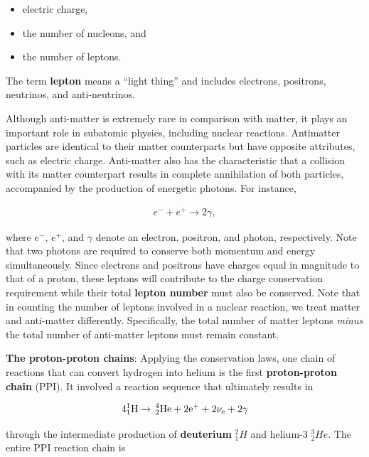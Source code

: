 \documentclass[a4paper,10pt]{article}
\begin{document}
\begin{itemize}
    \item electric charge,
    \item the number of nucleons, and
    \item the number of leptons.
\end{itemize}

{\noindent}The term \textbf{lepton} means a ``light thing'' and includes electrons, positrons, neutrinos, and anti-neutrinos.

{\noindent}Although anti-matter is extremely rare in comparison with matter, it plays an important role in subatomic physics, including nuclear reactions. Antimatter particles are identical to their matter counterparts but have opposite attributes, such as electric charge. Anti-matter also has the characteristic that a collision with its matter counterpart results in complete annihilation of both particles, accompanied by the production of energetic photons. For instance,

\begin{align*}
    e^- + e^+ \rightarrow 2\gamma,
\end{align*}

{\noindent}where $e^-$, $e^+$, and $\gamma$ denote an electron, positron, and photon, respectively. Note that two photons are required to conserve both momentum and energy simultaneously. Since electrons and positrons have charges equal in magnitude to that of a proton, these leptons will contribute to the charge conservation requirement while their total \textbf{lepton number} must also be conserved. Note that in counting the number of leptons involved in a nuclear reaction, we treat matter and anti-matter differently. Specifically, the total number of matter leptons \textit{minus} the total number of anti-matter leptons must remain constant.

{\noindent}\textbf{The proton-proton chains}: Applying the conservation laws, one chain of reactions that can convert hydrogen into helium is the first \textbf{proton-proton chain} (PPI). It involved a reaction sequence that ultimately results in

\begin{align*}
    {\rm 4^1_1H \rightarrow\,^4_2He + 2e^+ + 2\nu_e + 2\gamma}
\end{align*}

{\noindent}through the intermediate production of \textbf{deuterium} $^2_1H$ and helium-$3$ $^3_2He$. The entire PPI reaction chain is
\end{document}
